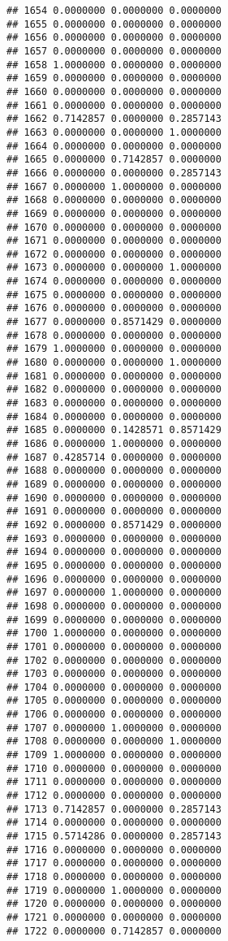 \documentclass[
]{article}
\begin{document}
\begin{verbatim}
## 1654 0.0000000 0.0000000 0.0000000
## 1655 0.0000000 0.0000000 0.0000000
## 1656 0.0000000 0.0000000 0.0000000
## 1657 0.0000000 0.0000000 0.0000000
## 1658 1.0000000 0.0000000 0.0000000
## 1659 0.0000000 0.0000000 0.0000000
## 1660 0.0000000 0.0000000 0.0000000
## 1661 0.0000000 0.0000000 0.0000000
## 1662 0.7142857 0.0000000 0.2857143
## 1663 0.0000000 0.0000000 1.0000000
## 1664 0.0000000 0.0000000 0.0000000
## 1665 0.0000000 0.7142857 0.0000000
## 1666 0.0000000 0.0000000 0.2857143
## 1667 0.0000000 1.0000000 0.0000000
## 1668 0.0000000 0.0000000 0.0000000
## 1669 0.0000000 0.0000000 0.0000000
## 1670 0.0000000 0.0000000 0.0000000
## 1671 0.0000000 0.0000000 0.0000000
## 1672 0.0000000 0.0000000 0.0000000
## 1673 0.0000000 0.0000000 1.0000000
## 1674 0.0000000 0.0000000 0.0000000
## 1675 0.0000000 0.0000000 0.0000000
## 1676 0.0000000 0.0000000 0.0000000
## 1677 0.0000000 0.8571429 0.0000000
## 1678 0.0000000 0.0000000 0.0000000
## 1679 1.0000000 0.0000000 0.0000000
## 1680 0.0000000 0.0000000 1.0000000
## 1681 0.0000000 0.0000000 0.0000000
## 1682 0.0000000 0.0000000 0.0000000
## 1683 0.0000000 0.0000000 0.0000000
## 1684 0.0000000 0.0000000 0.0000000
## 1685 0.0000000 0.1428571 0.8571429
## 1686 0.0000000 1.0000000 0.0000000
## 1687 0.4285714 0.0000000 0.0000000
## 1688 0.0000000 0.0000000 0.0000000
## 1689 0.0000000 0.0000000 0.0000000
## 1690 0.0000000 0.0000000 0.0000000
## 1691 0.0000000 0.0000000 0.0000000
## 1692 0.0000000 0.8571429 0.0000000
## 1693 0.0000000 0.0000000 0.0000000
## 1694 0.0000000 0.0000000 0.0000000
## 1695 0.0000000 0.0000000 0.0000000
## 1696 0.0000000 0.0000000 0.0000000
## 1697 0.0000000 1.0000000 0.0000000
## 1698 0.0000000 0.0000000 0.0000000
## 1699 0.0000000 0.0000000 0.0000000
## 1700 1.0000000 0.0000000 0.0000000
## 1701 0.0000000 0.0000000 0.0000000
## 1702 0.0000000 0.0000000 0.0000000
## 1703 0.0000000 0.0000000 0.0000000
## 1704 0.0000000 0.0000000 0.0000000
## 1705 0.0000000 0.0000000 0.0000000
## 1706 0.0000000 0.0000000 0.0000000
## 1707 0.0000000 1.0000000 0.0000000
## 1708 0.0000000 0.0000000 1.0000000
## 1709 1.0000000 0.0000000 0.0000000
## 1710 0.0000000 0.0000000 0.0000000
## 1711 0.0000000 0.0000000 0.0000000
## 1712 0.0000000 0.0000000 0.0000000
## 1713 0.7142857 0.0000000 0.2857143
## 1714 0.0000000 0.0000000 0.0000000
## 1715 0.5714286 0.0000000 0.2857143
## 1716 0.0000000 0.0000000 0.0000000
## 1717 0.0000000 0.0000000 0.0000000
## 1718 0.0000000 0.0000000 0.0000000
## 1719 0.0000000 1.0000000 0.0000000
## 1720 0.0000000 0.0000000 0.0000000
## 1721 0.0000000 0.0000000 0.0000000
## 1722 0.0000000 0.7142857 0.0000000

\end{verbatim}
\end{document}
